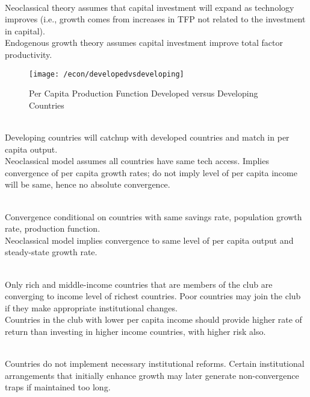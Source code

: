 \begin{remark} \\
Neoclassical theory assumes that capital investment will expand as technology improves (i.e., growth comes from increases in TFP not related to the investment in capital).\\
Endogenous growth theory assumes capital investment improve total factor productivity.
\end{remark}

\begin{figure}[H]
\centering
\texttt{[image: /econ/developedvsdeveloping]}
\caption{Per Capita Production Function Developed versus Developing Countries}
\end{figure}

\begin{definition} \\
Developing countries will catchup with developed countries and match in per capita output.\\
Neoclassical model assumes all countries have same tech access. Implies convergence of per capita growth rates; do not imply level of per capita income will be same, hence no absolute convergence.
\end{definition}

\begin{definition} \\
Convergence conditional on countries with same savings rate, population growth rate, production function.\\
Neoclassical model implies convergence to same level of per capita output and steady-state growth rate.
\end{definition}

\begin{definition} \\
Only rich and middle-income countries that are members of the club are converging to income level of richest countries. Poor countries may join the club if they make appropriate institutional changes.\\
Countries in the club with lower per capita income should provide higher rate of return than investing in higher income countries, with higher risk also.
\end{definition}

\begin{definition} \\
Countries do not implement necessary institutional reforms. Certain institutional arrangements that initially enhance growth may later generate non-convergence traps if maintained too long.
\end{definition}

